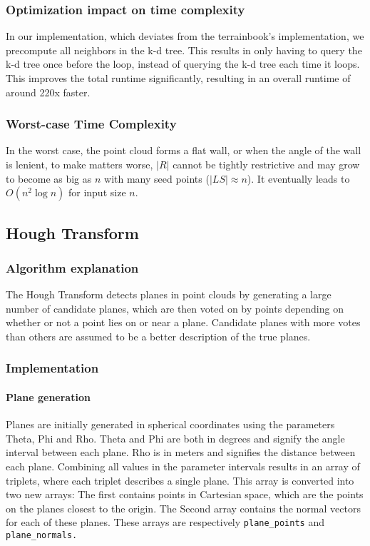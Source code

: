 \documentclass[a4paper,9pt]{article}
\begin{document}
\subsubsection{Optimization impact on time complexity}
In our implementation, which deviates from the terrainbook's implementation, we precompute all neighbors in the k-d tree. This results in only having to query the k-d tree once before the loop, instead of querying the k-d tree each time it loops. This improves the total runtime significantly, resulting in an overall runtime of around 220x faster.

\subsubsection{Worst-case Time Complexity}
In the worst case, the point cloud forms a flat wall, or when the angle of the wall is lenient, to make matters worse, \( |R| \) cannot be tightly restrictive and may grow to become as big as \( n \) with many seed points (\( |LS| \approx n \)). It eventually leads to \( O(n^2 \log n) \) for input size \( n \).




\subsection{Hough Transform}
\subsubsection{Algorithm explanation}
The Hough Transform detects planes in point clouds by generating a large number of candidate planes, which are then voted on by points depending on whether or not a point lies on or near a plane. Candidate planes with more votes than others are assumed to be a better description of the true planes.

\subsubsection{Implementation}

\paragraph{Plane generation}

Planes are initially generated in spherical coordinates using the parameters Theta, Phi and Rho. Theta and Phi are both in degrees and signify the angle interval between each plane. Rho is in meters and signifies the distance between each plane. Combining all values in the parameter intervals results in an array of triplets, where each triplet describes a single plane. This array is converted into two new arrays: The first contains points in Cartesian space, which are the points on the planes closest to the origin. The Second array contains the normal vectors for each of these planes. These arrays are respectively \verb|plane_points| and \verb|plane_normals.|
\end{document}
